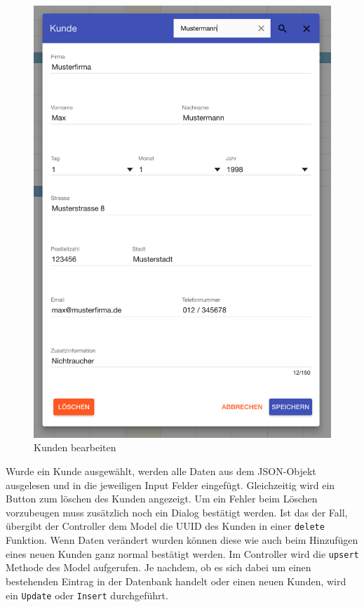 \begin{figure}[H]
\begin{minipage}[t]{0.49\linewidth}
        \includegraphics[width=\linewidth]{images/frontend_customer_edit.png}
        \caption{Kunden bearbeiten}
        \label{frontend_customer_edit}
    \end{minipage}
\end{figure}

Wurde ein Kunde ausgewählt, werden alle Daten aus dem JSON-Objekt ausgelesen und in die jeweiligen Input Felder eingefügt.
Gleichzeitig wird ein Button zum löschen des Kunden angezeigt. Um ein Fehler beim Löschen vorzubeugen muss zusätzlich noch ein Dialog bestätigt werden.
Ist das der Fall, übergibt der Controller dem Model die UUID des Kunden in einer \texttt{delete} Funktion. 
Wenn Daten verändert wurden können diese wie auch beim Hinzufügen eines neuen Kunden ganz normal bestätigt werden.
Im Controller wird die \texttt{upsert} Methode des Model aufgerufen. Je nachdem, ob es sich dabei um einen bestehenden Eintrag in der Datenbank handelt oder einen neuen Kunden, wird ein \texttt{Update} oder \texttt{Insert} durchgeführt.

